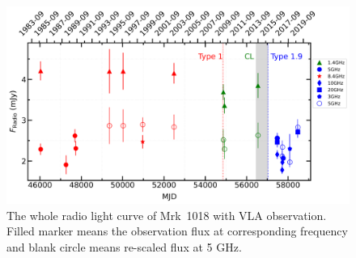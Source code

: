 \documentclass[twocolumn]{aastex63}
\begin{document}
\begin{figure}
\centering
	\includegraphics[width=\textwidth]{./pic/subplots-radio-second_freq.png}
    \caption{The whole radio light curve of Mrk~1018 with VLA observation. Filled marker means the observation flux at corresponding frequency and blank circle means re-scaled flux at 5 GHz.}
    \label{fig:radio-lc}
\end{figure}
\end{document}

